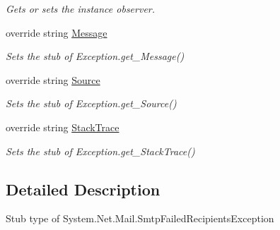 \begin{DoxyCompactItemize}
\begin{DoxyCompactList}\small\item\em Gets or sets the instance observer.\end{DoxyCompactList}\item 
override string \hyperlink{class_system_1_1_net_1_1_mail_1_1_fakes_1_1_stub_smtp_failed_recipients_exception_a4db9df97f3c814d290660f01d789a9ef}{Message}
\begin{DoxyCompactList}\small\item\em Sets the stub of Exception.\-get\-\_\-\-Message()\end{DoxyCompactList}\item 
override string \hyperlink{class_system_1_1_net_1_1_mail_1_1_fakes_1_1_stub_smtp_failed_recipients_exception_a18feb7b57d1e50856f72688821fe5c9e}{Source}
\begin{DoxyCompactList}\small\item\em Sets the stub of Exception.\-get\-\_\-\-Source()\end{DoxyCompactList}\item 
override string \hyperlink{class_system_1_1_net_1_1_mail_1_1_fakes_1_1_stub_smtp_failed_recipients_exception_a9e163cf300448b665634ebe87e30d0f2}{Stack\-Trace}
\begin{DoxyCompactList}\small\item\em Sets the stub of Exception.\-get\-\_\-\-Stack\-Trace()\end{DoxyCompactList}\end{DoxyCompactItemize}


\subsection{Detailed Description}
Stub type of System.\-Net.\-Mail.\-Smtp\-Failed\-Recipients\-Exception



